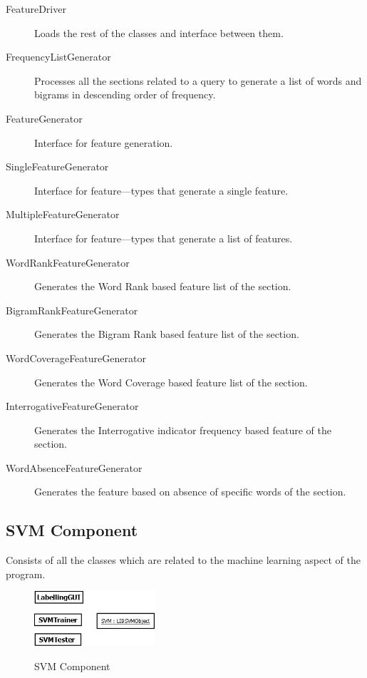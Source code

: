 \documentclass[10pt,a4paper]{report}
\begin{document}
\begin{description}
	\item[FeatureDriver] Loads the rest of the classes and interface between them.
	\item[FrequencyListGenerator] Processes all the sections related to a query to generate a list of words and bigrams in descending order of frequency.
	\item[FeatureGenerator] Interface for feature generation.
	\item[SingleFeatureGenerator] Interface for feature---types that generate a single feature.
	\item[MultipleFeatureGenerator] Interface for feature---types that generate a list of features.
	\item[WordRankFeatureGenerator] Generates the Word Rank based feature list of the section.
	\item[BigramRankFeatureGenerator] Generates the Bigram Rank based feature list of the section.
	\item[WordCoverageFeatureGenerator] Generates the Word Coverage based feature list of the section.
	\item[InterrogativeFeatureGenerator] Generates the Interrogative indicator frequency based feature of the section.
	\item[WordAbsenceFeatureGenerator] Generates the feature based on absence of specific words of the section.
\end{description}

\clearpage


\subsection{SVM Component}

Consists of all the classes which are related to the machine learning aspect of the program. \\

\begin{figure}[h!]
\centering
\includegraphics[width=0.40\textwidth]{./diagrams/SVM}\\
\caption{SVM Component}
\end{figure}
\end{document}

